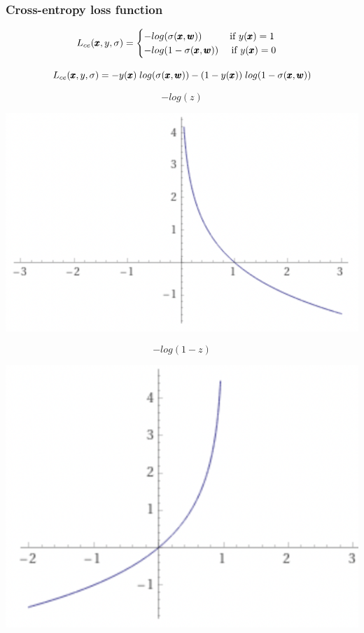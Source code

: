 \documentclass[usenames,dvipsnames]{beamer}
\begin{document}
\begin{frame}
  \frametitle{Cross-entropy loss function}
  \[
  	L_{ce}(\pmb{x}, y, \sigma) = 
  	\begin{cases}
  		-log(\sigma(\pmb{x}, \pmb{w})) \quad \quad \; \; \text{ if } y(\pmb{x})=1 \\
  		-log(1 - \sigma(\pmb{x}, \pmb{w})) \quad \text{ if } y(\pmb{x})=0
  	\end{cases}
  	\]
  	
  	\[
  	L_{ce}(\pmb{x}, y, \sigma) = -y(\pmb{x}) \; log(\sigma(\pmb{x}, \pmb{w})) -(1-y(\pmb{x})) \; log(1 - \sigma(\pmb{x}, \pmb{w}))
  	\]


  
\begin{minipage}[c]{0.5\textwidth}
	\centering
	
	\[-log(z)\]
	
	\includegraphics[scale=.4]{-log2x}
\end{minipage}\begin{minipage}[c]{0.5\textwidth}
	\centering
	
	\[-log(1-z)\]
	
	\includegraphics[scale=.4]{-log2(1-x)}
\end{minipage}

\end{frame}
\end{document}
